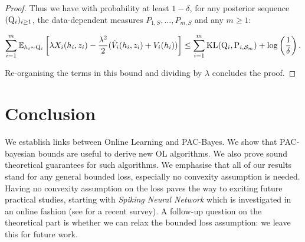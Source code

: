 \begin{proof}
 Thus we have with probability at least $1-\delta$, for any posterior sequence $(\mathrm{Q}_{i})_{i\geq 1}$, the data-dependent measures $P_{1,S},...,P_{m,S}$ and any $m\geq 1$:

 \begin{align*}
  \sum_{i=1}^m \mathbb{E}_{h_i\sim \mathrm{Q}_{i}}\left[\lambda X_i(h_i,z_i)  - \frac{\lambda^2}{2}(\hat{V}_i(h_i,z_i) + V_i(h_i))\right] \leq \sum_{i=1}^m \operatorname{KL}(\mathrm{Q}_{i},\mathrm{P}_{i,\mathcal{S}_m}) + \log \left( \frac{1}{\delta}  \right).
 \end{align*}

 Re-organising the terms in this bound and dividing by $\lambda$ concludes the proof.

 \end{proof}


 \section{Conclusion}

We establish links between Online Learning and PAC-Bayes. We show that PAC-bayesian bounds are useful to derive new OL algorithms. We also prove sound theoretical guarantees for such algorithms. We emphasise that all of our results stand for any general bounded loss, especially no convexity assumption is needed.
Having no convexity assumption on the loss paves the way to exciting future practical studies, starting with \emph{Spiking Neural Network} which is investigated in an online fashion (see \citealp{lobo2020spiking} for a recent survey). A follow-up question on the theoretical part is whether we can relax the bounded loss assumption: we leave this for future work.

